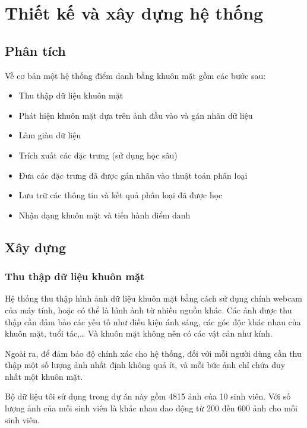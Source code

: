 \chapter{Thiết kế và xây dựng hệ thống}
\label{cha:chap3}

\section{Phân tích}
Về cơ bản một hệ thống điểm danh bằng khuôn mặt gồm các bước sau:
\begin{itemize}
    \item Thu thập dữ liệu khuôn mặt
    \item Phát hiện khuôn mặt dựa trên ảnh đầu vào và gán nhãn dữ liệu
    \item Làm giàu dữ liệu
    \item Trích xuất các đặc trưng (sử dụng học sâu)
    \item Đưa các đặc trưng đã được gán nhãn vào thuật toán phân loại
    \item Lưu trữ các thông tin và kết quả phân loại đã được học
    \item Nhận dạng khuôn mặt và tiến hành điểm danh
\end{itemize}

\section{Xây dựng}

\subsection{Thu thập dữ liệu khuôn mặt}
Hệ thống thu thập hình ảnh dữ liệu khuôn mặt bằng cách sử dụng chính webcam
của máy tính, hoặc có thể là hình ảnh từ nhiều nguồn khác.
Các ảnh được thu thập cần đảm bảo các yếu tố như điều kiện ánh sáng,
các góc độc khác nhau của khuôn mặt, tuổi tác,…
Và khuôn mặt không nên có các vật cản như kính.

Ngoài ra, để đảm bảo độ chính xác cho hệ thống, đối với mỗi người dùng
cần thu thập một số lượng ảnh nhất định không quá ít, và mỗi bức ảnh chỉ
chứa duy nhất một khuôn mặt.

Bộ dữ liệu tôi sử dụng trong dự án này gồm 4815 ảnh của 10 sinh viên.
Với số lượng ảnh của mỗi sinh viên là khác nhau dao động từ 200 đến 600
ảnh cho mỗi sinh viên.
